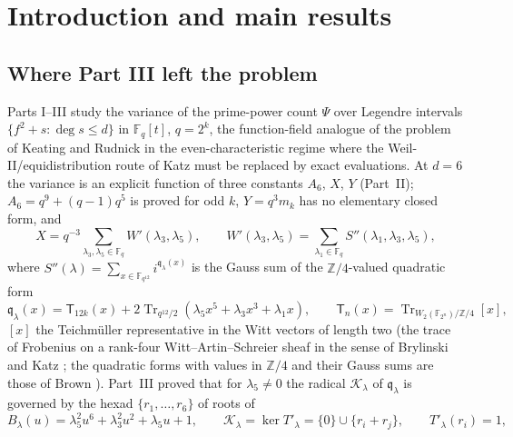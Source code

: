 \documentclass[12pt,a4paper]{amsart}
\theoremstyle{definition}
\newcommand{\F}{\mathbb{F}}
\newcommand{\Z}{\mathbb{Z}}
\newcommand{\Tr}{\operatorname{Tr}}
\newcommand{\Kk}{\mathcal{K}}
\newcommand{\qq}{\mathfrak{q}}
\newcommand{\Spp}{S''}
\newcommand{\Tw}{\mathsf{T}}
\begin{document}
\begin{abstract}
result is $X=(-1)^{k+1}q^6+q^5$ for all $k$, as conjectured in Part~II. An explicit nonsingular $11\times11$ system of pure and mixed moments whose unique solution is the table of class counts is also written down; its higher Gauss-sum totals follow.
\end{abstract}

\maketitle
\tableofcontents

\section{Introduction and main results}\label{sec:intro}

\subsection{Where Part III left the problem}
Parts I--III \cite{Chen,ChenII,ChenIII} study the variance of the prime-power count $\Psi$ over Legendre intervals $\{f^2+s:\deg s\le d\}$ in $\F_q[t]$, $q=2^k$, the function-field analogue of the problem of Keating and Rudnick \cite{KeatingRudnick} in the even-characteristic regime where the Weil-II/equidistribution route of Katz \cite{KatzKR,KatzEKR} must be replaced by exact evaluations. At $d=6$ the variance is an explicit function of three constants $A_6$, $X$, $Y$ (Part~II); $A_6=q^9+(q-1)q^5$ is proved for odd $k$, $Y=q^3m_k$ has no elementary closed form, and
\begin{equation}\label{eq:X}
X=q^{-3}\sum_{\lambda_3,\lambda_5\in\F_q}W'(\lambda_3,\lambda_5),\qquad W'(\lambda_3,\lambda_5)=\sum_{\lambda_1\in\F_q}\Spp(\lambda_1,\lambda_3,\lambda_5),
\end{equation}
where $\Spp(\lambda)=\sum_{x\in\F_{q^{12}}}i^{\qq_\lambda(x)}$ is the Gauss sum of the $\Z/4$-valued quadratic form
\[
\qq_\lambda(x)=\Tw_{12k}(x)+2\Tr_{q^{12}/2}(\lambda_5x^5+\lambda_3x^3+\lambda_1x),\qquad \Tw_n(x)=\Tr_{W_2(\F_{2^n})/\Z/4}[x],
\]
$[x]$ the Teichm\"uller representative in the Witt vectors of length two (the trace of Frobenius on a rank-four Witt--Artin--Schreier sheaf in the sense of Brylinski \cite{Brylinski} and Katz \cite{KatzKR}; the quadratic forms with values in $\Z/4$ and their Gauss sums are those of Brown \cite{Brown}). Part~III proved that for $\lambda_5\ne0$ the radical $\Kk_\lambda$ of $\qq_\lambda$ is governed by the hexad $\{r_1,\dots,r_6\}$ of roots of
\[
B_\lambda(u)=\lambda_5^2u^6+\lambda_3^2u^2+\lambda_5u+1,\qquad \Kk_\lambda=\ker T'_\lambda=\{0\}\cup\{r_i+r_j\},\qquad T'_\lambda(r_i)=1,
\]
\end{document}
